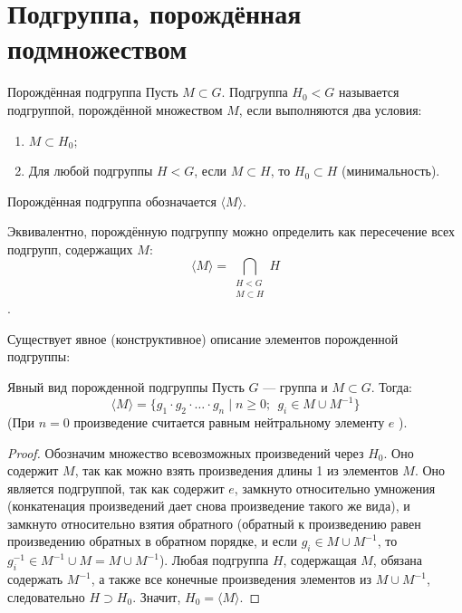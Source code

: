 
\section{Подгруппа, порождённая подмножеством}

\begin{Definition}{Порождённая подгруппа}{}
	Пусть $M \subset G$. Подгруппа $H_0 < G$ называется подгруппой, порождённой множеством $M$, если выполняются два условия:
	\begin{enumerate}
		\item $M \subset H_0$;
		\item Для любой подгруппы $H < G$, если $M \subset H$, то $H_0 \subset H$ (минимальность).
	\end{enumerate}
	Порождённая подгруппа обозначается $\langle M \rangle$.
\end{Definition}

Эквивалентно, порождённую подгруппу можно определить как пересечение всех подгрупп, содержащих $M$:
\[
\langle M \rangle = \bigcap_{\substack{ H < G \\ M \subset H}} H
\].

Существует явное (конструктивное) описание элементов порожденной подгруппы:
\begin{Proposition}{Явный вид порожденной подгруппы}{}
	Пусть $G$ --- группа и $M \subset G$. Тогда:
	\[
	\langle M \rangle = \{ g_1\cdot g_2 \cdot \ldots \cdot g_n \mid n \ge 0; \ \ g_i \in M \cup M^{-1} \}
	\]
	(При $n=0$ произведение считается равным нейтральному элементу $e$ ).
\end{Proposition}
\begin{proof}
	Обозначим множество всевозможных произведений через $H_0$.
	Оно содержит $M$, так как можно взять произведения длины 1 из элементов $M$.
	Оно является подгруппой, так как содержит $e$, замкнуто относительно умножения (конкатенация произведений дает снова произведение такого же вида), и замкнуто относительно взятия обратного (обратный к произведению равен произведению обратных в обратном порядке, и если $g_i \in M \cup M^{-1}$, то $g_i^{-1} \in M^{-1} \cup M = M \cup M^{-1}$).
	Любая подгруппа $H$, содержащая $M$, обязана содержать $M^{-1}$, а также все конечные произведения элементов из $M \cup M^{-1}$, следовательно $H \supset H_0$.
	Значит, $H_0 = \langle M \rangle$.
\end{proof}
